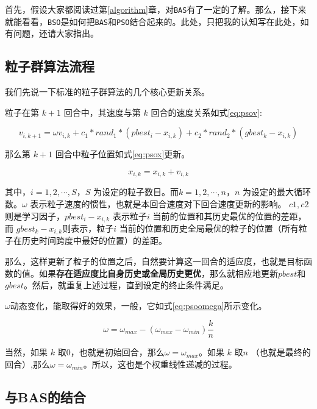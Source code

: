 \documentclass[]{ctexbook}
\theoremstyle{definition}
\theoremstyle{definition}
\theoremstyle{definition}
\theoremstyle{remark}
\begin{document}
首先，假设大家都阅读过第\ref{algorithm}章，对\texttt{BAS}有了一定的了解。那么，接下来就能看看，\texttt{BSO}是如何把\texttt{BAS}和\texttt{PSO}结合起来的。此处，只把我的认知写在此处，如有问题，还请大家指出。

\subsection{粒子群算法流程}

我们先说一下标准的粒子群算法的几个核心更新关系。

粒子在第 \(k+1\) 回合中，其速度与第 \(k\)
回合的速度关系如式\eqref{eq:psov}:

\begin{equation}
v_{i,k+1} = \omega v_{i,k} + c_1*rand_1*(pbest_i-x_{i,k})+c_2*rand_2*(gbest_k-x_{i,k})
\label{eq:psov}
\end{equation}

那么第 \(k+1\) 回合中粒子位置如式\eqref{eq:psox}更新。

\begin{equation}
x_{i,k} = x_{i,k} + v_{i,k}
\label{eq:psox}
\end{equation}

其中，\(i=1,2,\cdots,S\)，\(S\)
为设定的粒子数目。而\(k=1,2,\cdots,n\)，\(n\)
为设定的最大循环数。\(\omega\)
表示粒子速度的惯性，也就是本回合速度对下回合速度更新的影响。
\(c1,c2\)则是学习因子，\(pbest_i-x_{i,k}\) 表示粒子\(i\)
当前的位置和其历史最优的位置的差距，而
\(gbest_k-x_{i,k}\)则表示，粒子\(i\)
当前的位置和历史全局最优的粒子的位置（所有粒子在历史时间跨度中最好的位置）的差距。

那么，这样更新了粒子的位置之后，自然要计算这一回合的适应度，也就是目标函数的值。如果\textbf{存在适应度比自身历史或全局历史更优}，那么就相应地更新\(pbest\)和\(gbest\)。然后，就重复上述过程，直到设定的终止条件满足。

\(\omega\)动态变化，能取得好的效果，一般，它如式\eqref{eq:psoomega}所示变化。

\begin{equation}
\omega = \omega_{max} - (\omega_{max}-\omega_{min})\frac{k}{n}
\label{eq:psoomega}
\end{equation}

当然，如果 \(k\)
取0，也就是初始回合，那么\(\omega = \omega_{max}\)。如果 \(k\) 取\(n\)
（也就是最终的回合）,那么\(\omega = \omega_{min}\)。所以，这也是个权重线性递减的过程。

\subsection{与BAS的结合}\label{bas}
\end{document}
